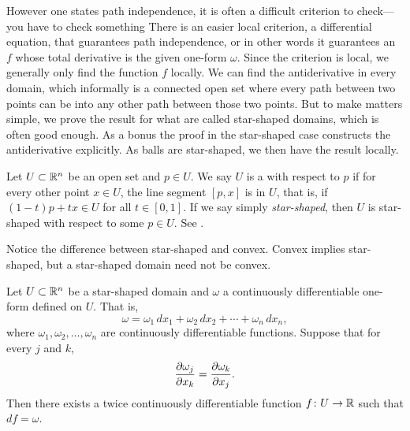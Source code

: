 However one states path independence, it is often a difficult criterion to
check---you have to check something 
There is an easier local criterion, a differential equation, that guarantees
path independence, or in other words it guarantees an
\emph{}
$f$ whose total derivative is the given one-form
$\omega$.  Since the criterion is local, we generally only find the
function $f$ locally.
We can find the antiderivative in every
\emph{} domain, which informally
is a connected open set where
every path between two points can be 
into any other path
between those two points.  But to make matters simple, we prove
the result for what are called star-shaped domains, which is often good enough.
As a bonus the proof in the star-shaped case constructs
the antiderivative explicitly.
As balls are star-shaped, we then have the result locally.

\begin{defn}
Let $U \subset {\mathbb{R}}^n$ be an open set and $p \in U$.  We say $U$ is
a \emph{}
with respect to $p$ if for every other point $x \in U$,
the line segment $[p,x]$ is in $U$, that is, if
$(1-t)p + tx \in U$ for all $t \in [0,1]$.
If we say simply \emph{star-shaped}, then $U$ is star-shaped with respect to
some $p \in U$.  See .
\begin{myfigureht}
\caption{A star-shaped domain with respect to $p$.\label{fig:starshaped}}
\end{myfigureht}
\end{defn}

Notice the difference between star-shaped and convex.  Convex implies
star-shaped, but a star-shaped domain need not be convex.

\begin{thm}
Let $U \subset {\mathbb{R}}^n$ be a star-shaped domain and $\omega$ a continuously
differentiable one-form defined on $U$.  That is,
\begin{equation*}
\omega =
\omega_1 \,dx_1 +
\omega_2 \,dx_2 + \cdots +
\omega_n \,dx_n ,
\end{equation*}
where $\omega_1,\omega_2,\ldots,\omega_n$ are continuously differentiable
functions.  Suppose that for every $j$ and $k$,
\begin{equation*}
\frac{\partial \omega_j}{\partial x_k} = \frac{\partial \omega_k}{\partial x_j} .
\avoidbreak
\end{equation*}
Then there exists a twice continuously differentiable function $f \colon U
\to {\mathbb{R}}$
such that $df = \omega$.
\end{thm}

